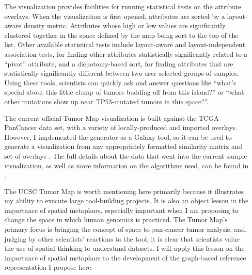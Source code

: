 \documentclass[11pt,proposal]{ucthesis}
\begin{document}
The visualization provides facilities for running statistical tests on the attribute overlays. When the visualization is first opened, attributes are sorted by a layout-aware density metric. Attributes whose high or low values are significantly clustered together in the space defined by the map being sort to the top of the list. Other available statistical tests include layout-aware and layout-independent association tests, for finding other attributes statistically significantly related to a ``pivot'' attribute, and a dichotomy-based sort, for finding attributes that are statistically significantly different between two user-selected groups of samples. Using these tools, scientists can quickly ask and answer questions like ``what's special about this little clump of tumors budding off from this island?'' or ``what other mutations show up near TP53-mutated tumors in this space?''.

The current official Tumor Map visualization is built against the TCGA PanCancer data set, with a variety of locally-produced and imported overlays. However, I implemented the generator as a Galaxy tool, so it can be used to generate a visualization from any appropriately formatted similarity matrix and set of overlays \cite{weinstein2013cancer,giardine2005galaxy}. The full details about the data that went into the current sample visualization, as well as more information on the algorithms used, can be found in \cite{novak2014ucsc}.

The UCSC Tumor Map is worth mentioning here primarily because it illustrates my ability to execute large tool-building projects. It is also an object lesson in the importance of spatial metaphors, especially important when I am proposing to change the space in which human genomics is practiced. The Tumor Map's primary focus is bringing the concept of space to pan-cancer tumor analysis, and, judging by other scientists' reactions to the tool, it is clear that scientists value the use of spatial thinking to understand datasets. I will apply this lesson on the importance of spatial metaphors to the development of the graph-based reference representation I propose here.

    
    
    
\end{document}
